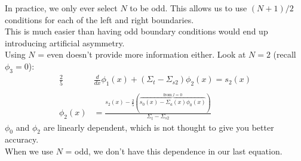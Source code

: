 \documentclass[12pt]{article}
\begin{document}
In practice, we only ever select $N$ to be odd. This allows us to use $(N+1)/2$ conditions for each of the left and right boundaries. \\
This is much easier than having odd boundary conditions would end up introducing artificial asymmetry. \\
Using $N$ = even doesn't provide more information either. Look at $N=2$ (recall $\phi_3 = 0$):
\begin{align*}
\frac{2}{5}&\frac{d}{dx}\phi_1(x) +(\Sigma_t - \Sigma_{s2})\phi_2(x) = s_2(x)\\
&\\
\phi_2(x) &= \frac{s_2(x) - \frac{2}{5}(\overbrace{s_0(x) - \Sigma_a(x)\phi_0(x)}^{\text{from }l=0})}{\Sigma_t - \Sigma_{s2}}
\end{align*}
$\phi_0$ and $\phi_2$ are linearly dependent, which is not thought to give you better accuracy.\\
When we use $N$ = odd, we don't have this dependence in our last equation. 
\end{document}
